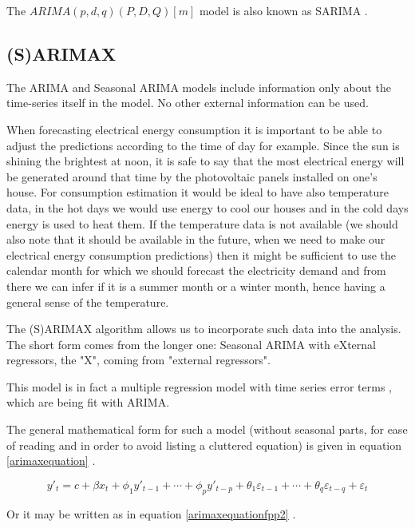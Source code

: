 \documentclass[12pt,a4paper,titlepage]{report}
\begin{document}
The $ ARIMA(p, d, q)(P, D, Q)[m] $ model is also known as SARIMA \cite{berkleysarimamodels}.

\subsection{(S)ARIMAX} \label{sarimaxsection}
The ARIMA and Seasonal ARIMA models include information only about the time-series itself in the model. No other external information can be used.

When forecasting electrical energy consumption it is important to be able to adjust the predictions according to the time of day for example. Since the sun is shining the brightest at noon, it is safe to say that the most electrical energy will be generated around that time by the photovoltaic panels installed on one's house. For consumption estimation it would be ideal to have also temperature data, in the hot days we would use energy to cool our houses and in the cold days energy is used to heat them. If the temperature data is not available (we should also note that it should be available in the future, when we need to make our electrical energy consumption predictions) then it might be sufficient to use the calendar month for which we should forecast the electricity demand and from there we can infer if it is a summer month or a winter month, hence having a general sense of the temperature.

The (S)ARIMAX algorithm allows us to incorporate such data into the analysis. The short form comes from the longer one: Seasonal ARIMA with eXternal regressors, the "X", coming from "external regressors".

This model is in fact a multiple regression model with time series error terms \cite{boxjenkins}, which are being fit with ARIMA.

The general mathematical form for such a model (without seasonal parts, for ease of reading and in order to avoid listing a cluttered equation) is given in equation \ref{arimaxequation} \cite{nauarimax}.

\begin{equation}
y'_{t} = c + \beta x_{t} + \phi_{1}y'_{t-1} + \cdots + \phi_{p}y'_{t-p} + \theta_{1}\varepsilon_{t-1} + \cdots + \theta_{q}\varepsilon_{t-q} + \varepsilon_{t} 
\label{arimaxequation}
\end{equation}

Or it may be written as in equation \ref{arimaxequationfpp2} \cite{hyndmanarimax} \cite{fpp2arimax}.
\end{document}
